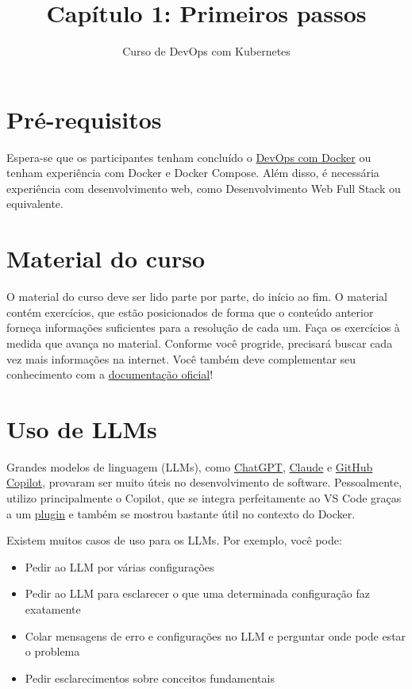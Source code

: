 \documentclass[11pt,a4paper]{article}
\title{\textbf{Capítulo 1: Primeiros passos}}
\author{Curso de DevOps com Kubernetes}
\date{}
\begin{document}
\maketitle

\tableofcontents
\vspace{1em}

\section{Pré-requisitos}
Espera-se que os participantes tenham concluído o \href{https://courses.mooc.fi/org/uh-cs/courses/devops-with-docker}{DevOps com Docker} ou tenham experiência com Docker e Docker Compose. Além disso, é necessária experiência com desenvolvimento web, como Desenvolvimento Web Full Stack ou equivalente.

\section{Material do curso}
O material do curso deve ser lido parte por parte, do início ao fim. O material contém exercícios, que estão posicionados de forma que o conteúdo anterior forneça informações suficientes para a resolução de cada um. Faça os exercícios à medida que avança no material. Conforme você progride, precisará buscar cada vez mais informações na internet. Você também deve complementar seu conhecimento com a \href{https://kubernetes.io/docs/home/}{documentação oficial}!

\section{Uso de LLMs}
Grandes modelos de linguagem (LLMs), como \href{https://chatgpt.com/}{ChatGPT}, \href{https://claude.ai/new}{Claude} e \href{https://github.com/features/copilot?locale=pt-br}{GitHub Copilot}, provaram ser muito úteis no desenvolvimento de software. Pessoalmente, utilizo principalmente o Copilot, que se integra perfeitamente ao VS Code graças a um \href{https://visualstudio.microsoft.com/pt-br/github-copilot/}{plugin} e também se mostrou bastante útil no contexto do Docker.

Existem muitos casos de uso para os LLMs. Por exemplo, você pode:
\begin{itemize}
    \item Pedir ao LLM por várias configurações
    \item Pedir ao LLM para esclarecer o que uma determinada configuração faz exatamente
    \item Colar mensagens de erro e configurações no LLM e perguntar onde pode estar o problema
    \item Pedir esclarecimentos sobre conceitos fundamentais
\end{itemize}
\end{document}
